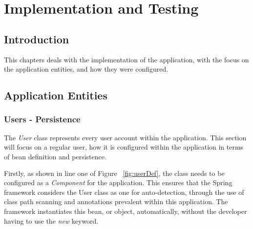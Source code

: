 \chapter{Implementation and Testing}
\label{impltesting}

\label{sec:impl}
\section{Introduction}

This chapters deals with the implementation of the application, with the focus on the application entities, and how they were configured.

\section{Application Entities}
\subsection{Users - Persistence}

The \textit{User} class represents every user account within the application. This section will focus on a regular user, how it is configured within the application in terms of bean definition and persistence. 

Firstly, as shown in line one of Figure ~\ref{fig:userDef}, the class needs to be configured as a \textit{Component} for the application. This ensures that the Spring framework considers the User class as one for auto-detection, through the use of class path scanning and annotations prevalent within this application. The framework instantiates this bean, or object, automatically, without the developer having to use the \textit{new} keyword.

